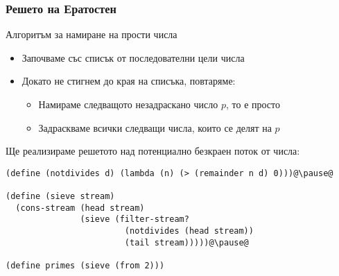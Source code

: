 \documentclass{beamer}
\begin{document}
\begin{frame}[fragile]
  \frametitle{Решето на Ератостен}

  \pause
  Алгоритъм за намиране на прости числа
  \pause
  \begin{itemize}
  \item Започваме със списък от последователни цели числа
  \item Докато не стигнем до края на списъка, повтаряме:
    \begin{itemize}
    \item Намираме следващото незадраскано число $p$, то е просто
    \item Задраскваме всички следващи числа, които се делят на $p$
    \end{itemize}
  \end{itemize}
  \pause
  Ще реализираме решетото над потенциално безкраен поток от числа:
  \pause
\begin{lstlisting}
(define (notdivides d) (lambda (n) (> (remainder n d) 0)))@\pause@

(define (sieve stream)
  (cons-stream (head stream)
               (sieve (filter-stream?
                        (notdivides (head stream))
                        (tail stream)))))@\pause@

(define primes (sieve (from 2)))
\end{lstlisting}
\end{frame}
\end{document}
